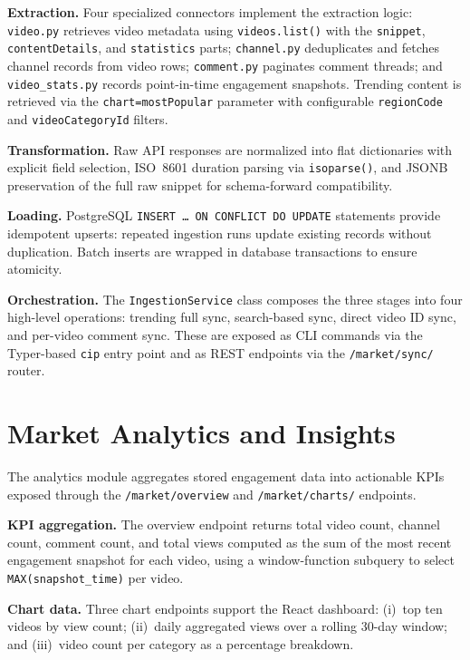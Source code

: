 \documentclass[ENG]{TFUOC}
\begin{document}
\textbf{Extraction.} Four specialized connectors implement the extraction logic: \texttt{video.py} retrieves video metadata using \texttt{videos.list()} with the \texttt{snippet}, \texttt{contentDetails}, and \texttt{statistics} parts; \texttt{channel.py} deduplicates and fetches channel records from video rows; \texttt{comment.py} paginates comment threads; and \texttt{video\_stats.py} records point-in-time engagement snapshots. Trending content is retrieved via the \texttt{chart=mostPopular} parameter with configurable \texttt{regionCode} and \texttt{videoCategoryId} filters.

\textbf{Transformation.} Raw API responses are normalized into flat dictionaries with explicit field selection, ISO~8601 duration parsing via \texttt{isoparse()}, and JSONB preservation of the full raw snippet for schema-forward compatibility.

\textbf{Loading.} PostgreSQL \texttt{INSERT … ON CONFLICT DO UPDATE} statements provide idempotent upserts: repeated ingestion runs update existing records without duplication. Batch inserts are wrapped in database transactions to ensure atomicity.

\textbf{Orchestration.} The \texttt{IngestionService} class composes the three stages into four high-level operations: trending full sync, search-based sync, direct video ID sync, and per-video comment sync. These are exposed as CLI commands via the Typer-based \texttt{cip} entry point and as REST endpoints via the \texttt{/market/sync/} router.

\section{Market Analytics and Insights}

The analytics module aggregates stored engagement data into actionable KPIs exposed through the \texttt{/market/overview} and \texttt{/market/charts/} endpoints.

\textbf{KPI aggregation.} The overview endpoint returns total video count, channel count, comment count, and total views computed as the sum of the most recent engagement snapshot for each video, using a window-function subquery to select \texttt{MAX(snapshot\_time)} per video.

\textbf{Chart data.} Three chart endpoints support the React dashboard: (i)~top ten videos by view count; (ii)~daily aggregated views over a rolling 30-day window; and (iii)~video count per category as a percentage breakdown.
\end{document}
